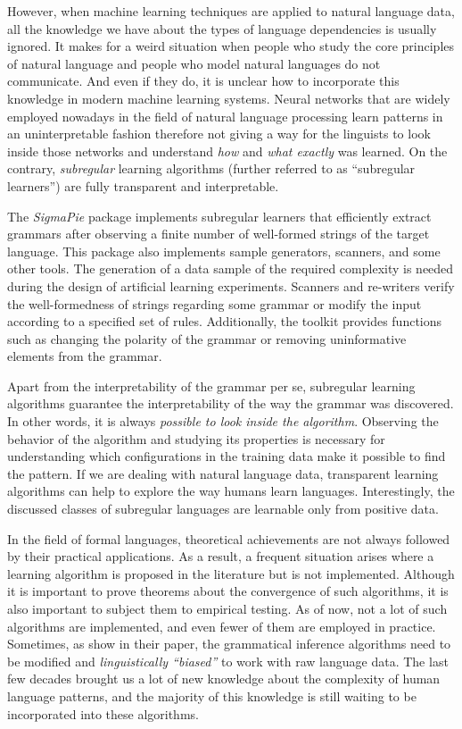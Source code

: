 However, when machine learning techniques are applied to natural language data, all the knowledge we have about the types of language dependencies is usually ignored.
It makes for a weird situation when people who study the core principles of natural language and people who model natural languages do not communicate.
And even if they do, it is unclear how to incorporate this knowledge in modern machine learning systems.
Neural networks that are widely employed nowadays in the field of natural language processing learn patterns in an uninterpretable fashion therefore not giving a way for the linguists to look inside those networks and understand \emph{how} and \emph{what exactly} was learned.
On the contrary, \emph{subregular} learning algorithms (further referred to as ``subregular learners'') are fully transparent and interpretable.


The \emph{SigmaPie} package implements subregular learners that efficiently extract grammars after observing a finite number of well-formed strings of the target language.
This package also implements sample generators, scanners, and some other tools.
The generation of a data sample of the required complexity is needed during the design of artificial learning experiments.
Scanners and re-writers verify the well-formedness of strings regarding some grammar or modify the input according to a specified set of rules.
Additionally, the toolkit provides functions such as changing the polarity of the grammar or removing uninformative elements from the grammar.


Apart from the interpretability of the grammar per se, subregular learning algorithms guarantee the interpretability of the way the grammar was discovered.
In other words, it is always \emph{possible to look inside the algorithm}.
Observing the behavior of the algorithm and studying its properties is necessary for understanding which configurations in the training data make it possible to find the pattern.
If we are dealing with natural language data, transparent learning algorithms can help to explore the way humans learn languages.
Interestingly, the discussed classes of subregular languages are learnable only from positive data.


In the field of formal languages, theoretical achievements are not always followed by their practical applications.
As a result, a frequent situation arises where a learning algorithm is proposed in the literature but is not implemented.
Although it is important to prove theorems about the convergence of such algorithms, it is also important to subject them to empirical testing.
As of now, not a lot of such algorithms are implemented, and even fewer of them are employed in practice.
Sometimes, as \cite{GildeaJurafsky1996} show in their paper, the grammatical inference algorithms need to be modified and \emph{linguistically ``biased''} to work with raw language data.
The last few decades brought us a lot of new knowledge about the complexity of human language patterns, and the majority of this knowledge is still waiting to be incorporated into these algorithms.


